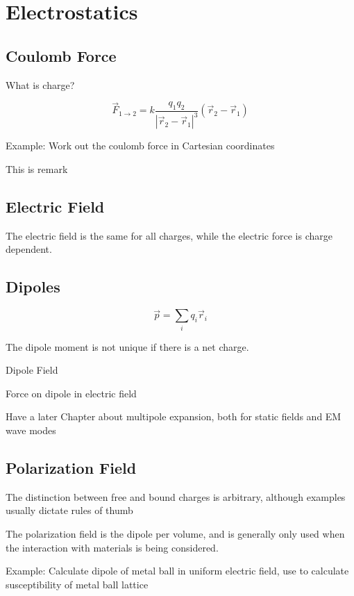 \documentclass[12pt,violet]{bbe}
\begin{document}
\chapter{Electrostatics}
	\section{Coulomb Force}
	What is charge?
	
	\begin{definition}
	$$ \vec{F}_{1 \rightarrow 2} = k \frac{q_1 q_2}{|\vec{r}_2 - \vec{r}_1|^3} (\vec{r}_2 - \vec{r}_1)$$
	\end{definition}
	
	Example: Work out the coulomb force in Cartesian coordinates
	
	\begin{remark}
	This is remark
	\end{remark}
	
	\section{Electric Field}
	The electric field is the same for all charges, while the electric force is charge dependent.
	
	\section{Dipoles}
	
	\begin{definition}
	$$ \vec{p} = \sum_i q_i \vec{r}_i$$
	\end{definition}
	
	The dipole moment is not unique if there is a net charge.
	
	Dipole Field
	
	Force on dipole in electric field
	
	Have a later Chapter about multipole expansion, both for static fields and EM wave modes
	
	
	\section{Polarization Field}
	\begin{remark}
	The distinction between free and bound charges is arbitrary, although examples usually dictate rules of thumb
	\end{remark}
	
	The polarization field is the dipole per volume, and is generally only used when the interaction with materials is being considered.
	
	Example: Calculate dipole of metal ball in uniform electric field, use to calculate susceptibility of metal ball lattice
	
	\blinddocument
	
\end{document}
